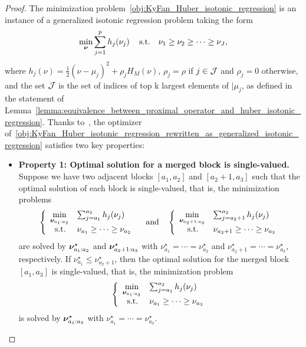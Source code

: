 \begin{proof}
    The minimization problem~\eqref{obj:KyFan_Huber_isotonic_regression} is an instance of a generalized isotonic regression problem taking the form
    \begin{align}
        \label{obj:KyFan_Huber_isotonic_regression_rewritten_as_generalized_isotonic_regression}
        \min_{\bm{\nu}} \sum_{j=1}^{p} h_j(\nu_j) \quad \operatorname{s.\!t.\!} \quad \nu_1 \geq \nu_2 \geq \cdots \geq \nu_J,
    \end{align}
    where $h_j(\nu) = \frac{1}{2} (\nu - \mu_j)^2 + \rho_j H_M(\nu)$, $\rho_j = \rho$ if $j \in \mathcal{J}$ and $\rho_j = 0$ otherwise, and the set $\mathcal{J}$ is the set of indices of top k largest elements of $\vert{\mu_j}$, as defined in the statement of Lemma~\ref{lemma:equivalence_between_proximal_operator_and_huber_isotonic_regression}.
    Thanks to~\cite{best2000minimizing,ahuja2001fast}, the optimizer of~\eqref{obj:KyFan_Huber_isotonic_regression_rewritten_as_generalized_isotonic_regression} satisfies two key properties: 
    \begin{itemize}[label=$\diamond$,leftmargin=*]
        \item \textbf{Property 1: Optimal solution for a merged block is single-valued.} 
        Suppose we have two adjacent blocks $[a_1, a_2]$ and $[a_2+1, a_3]$ such that the optimal solution of each block is single-valued, that is, the minimization problems
        \begin{align*}
            \left\{
            \begin{array}{cl}
                \min\limits_{\bm{\nu}_{a_1:a_2}} & \sum_{j=a_1}^{a_2} h_j(\nu_j) \\
                \operatorname{s.\!t.\!} & \nu_{a_1} \geq \cdots \geq \nu_{a_2}
            \end{array}
            \right. \quad \text{and} \quad
            \left\{
            \begin{array}{cl}
                \min\limits_{\bm{\nu}_{a_2+1:a_3}} & \sum_{j=a_2+1}^{a_3} h_j(\nu_j) \\
                \operatorname{s.\!t.\!} & \nu_{a_2+1} \geq \cdots \geq \nu_{a_3} \\
            \end{array}
            \right.
        \end{align*}
        are solved by $\bm{\nu}_{a_1:a_2}^\star$ and $\bm{\nu}_{a_2+1:a_3}^\star$ with $\nu_{a_1}^\star = \cdots = \nu_{a_2}^\star$ and $\nu_{a_2+1}^\star = \cdots = \nu_{a_3}^\star$, respectively.
        If $\nu_{a_1}^\star \leq \nu_{a_2+1}^\star$, then the optimal solution for the merged block $[a_1, a_3]$ is single-valued, that is, the minimization problem
        \begin{align*}
            \left\{
            \begin{array}{cl}
                \min\limits_{\bm{\nu}_{a_1:a_3}} & \sum_{j=a_1}^{a_3} h_j(\nu_j) \\
                \operatorname{s.\!t.\!} & \nu_{a_1} \geq \cdots \geq \nu_{a_3}
            \end{array}
            \right.
        \end{align*}
        is solved by $\bm{\nu}_{a_1:a_3}^\star$ with $\nu_{a_1}^\star = \cdots = \nu_{a_3}^\star$.


\end{itemize}
\end{proof}
